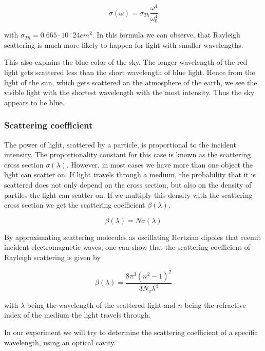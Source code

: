 \documentclass[10pt,a4paper]{article}
\begin{document}
\begin{equation}
\sigma(\omega) = \sigma_{Th} \frac{\omega^4}{\omega_0^4}
\end{equation}

with $\sigma_{Th} = 0.665 \cdot 10^-24 cm^2$. In this formula we can observe, that Rayleigh scattering is much more likely to happen for light with smaller wavelengths.

This also explains the blue color of the sky. The longer wavelength of the red light gets scattered less than the short wavelength of blue light. Hence from the light of the sun, which gets scattered on the atmosphere of the earth, we see the visible light with the shortest wavelength with the most intensity. Thus the sky appears to be blue.

\subsubsection{Scattering coefficient}

The power of light, scattered by a particle, is proportional to the incident intensity. The proportionality constant for this case is known as the scattering cross section $\sigma(\lambda)$. However, in most cases we have more than one object the light can scatter on. If light travels through a medium, the probability that it is scattered does not only depend on the cross section, but also on the density of partiles the light can scatter on. If we multiply this density with the scattering cross section we get the scattering coefficient $\beta(\lambda)$.

\begin{equation}
\beta(\lambda) = N \sigma(\lambda)
\end{equation} 

By approximating scattering molecules as oscillating Hertzian dipoles that reemit incident electromagnetic waves, one can show that the scattering coefficient of Rayleigh scattering is given by

\begin{equation}
\beta(\lambda) =  \frac{8 \pi^3 (n^2-1)^2}{3N_{v}\lambda^4}
\end{equation}

with $\lambda$ being the wavelength of the scattered light and $n$ being the refractive index of the medium the light travels through.

In our experiment we will try to determine the scattering coefficient of a specific wavelength, using an optical cavity.
\end{document}
